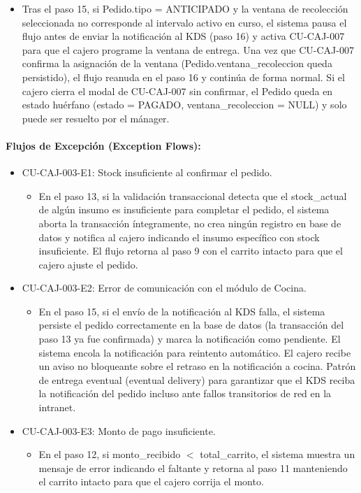 \begin{itemize}
\begin{itemize}
        \item Tras el paso 15, si Pedido.tipo = ANTICIPADO y la ventana de recolección seleccionada no corresponde al intervalo activo en curso, el sistema pausa el flujo antes de enviar la notificación al KDS (paso 16) y activa CU-CAJ-007 para que el cajero programe la ventana de entrega. Una vez que CU-CAJ-007 confirma la asignación de la ventana (Pedido.ventana\_recoleccion queda persistido), el flujo reanuda en el paso 16 y continúa de forma normal. Si el cajero cierra el modal de CU-CAJ-007 sin confirmar, el Pedido queda en estado huérfano (estado = PAGADO, ventana\_recoleccion = NULL) y solo puede ser resuelto por el mánager.
    \end{itemize}
\end{itemize}

\paragraph{Flujos de Excepción (Exception Flows):}
\begin{itemize}
    \item CU-CAJ-003-E1: Stock insuficiente al confirmar el pedido.
    \begin{itemize}
        \item En el paso 13, si la validación transaccional detecta que el stock\_actual de algún insumo es insuficiente para completar el pedido, el sistema aborta la transacción íntegramente, no crea ningún registro en base de datos y notifica al cajero indicando el insumo específico con stock insuficiente. El flujo retorna al paso 9 con el carrito intacto para que el cajero ajuste el pedido.
    \end{itemize}
    \item CU-CAJ-003-E2: Error de comunicación con el módulo de Cocina.
    \begin{itemize}
        \item En el paso 15, si el envío de la notificación al KDS falla, el sistema persiste el pedido correctamente en la base de datos (la transacción del paso 13 ya fue confirmada) y marca la notificación como pendiente. El sistema encola la notificación para reintento automático. El cajero recibe un aviso no bloqueante sobre el retraso en la notificación a cocina. Patrón de entrega eventual (eventual delivery) para garantizar que el KDS reciba la notificación del pedido incluso ante fallos transitorios de red en la intranet.
    \end{itemize}
    \item CU-CAJ-003-E3: Monto de pago insuficiente.
    \begin{itemize}
        \item En el paso 12, si monto\_recibido $<$ total\_carrito, el sistema muestra un mensaje de error indicando el faltante y retorna al paso 11 manteniendo el carrito intacto para que el cajero corrija el monto.
    \end{itemize}
\end{itemize}


